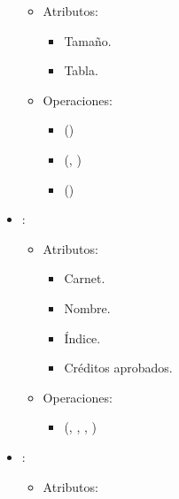 \documentclass[11pt]{article}
\begin{document}
\begin{itemize}
      \begin{itemize}
         \item Atributos:

         \begin{itemize}
            \item Tamaño.
            \item Tabla.
         \end{itemize}
      \end{itemize}

      \begin{itemize}
         \item Operaciones:
         
         \begin{itemize}
            \item {}()
            \item {}(, )
            \item {}()
         \end{itemize}
      \end{itemize}

      \item {}:
      \begin{itemize}
         \item Atributos:

         \begin{itemize}
            \item Carnet.
            \item Nombre.
            \item Índice.
            \item Créditos aprobados.
         \end{itemize}
      \end{itemize}

      \begin{itemize}
         \item Operaciones:
         
         \begin{itemize}
            \item {}(, , , )
         \end{itemize}
      \end{itemize}

      \item {}:
      \begin{itemize}
         \item Atributos:


\end{itemize}
\end{itemize}
\end{document}
